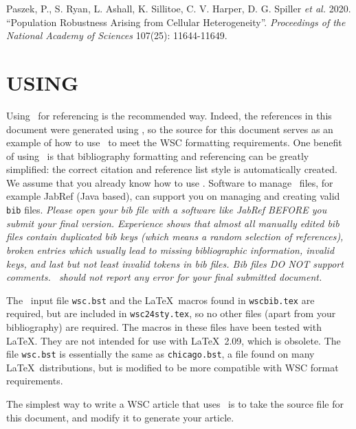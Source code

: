 \documentclass{wscpaperproc}
\theoremstyle{wsc}
\begin{document}
{\footnotesize
\begin{hangref}
\item Paszek, P., S. Ryan, L. Ashall, K. Sillitoe, C. V. Harper, D. G. Spiller \textit{et al.} 2020. ``Population Robustness Arising from Cellular Heterogeneity''. \textit{Proceedings of the National Academy of Sciences} 107(25): 11644-11649.
\end{hangref}
}

\section{USING \texorpdfstring{\BibTeX}{BibTex}}
\label{sec:bibtex}
Using \BibTeX\ for referencing is the recommended way. Indeed, the references in this document were generated using \BibTeX, so the source for this
document serves as an example of how to use \BibTeX\ to meet the WSC formatting requirements.
One benefit of using \BibTeX\ is that bibliography formatting and referencing can be greatly simplified: the correct citation and reference list style is automatically created.
We assume that you already know how to use \BibTeX.
Software to manage \BibTeX\ files, for example JabRef (Java based), can support you on managing and creating valid {\tt bib} files.
{\em Please open your bib file with a software like JabRef BEFORE you submit your final version. Experience shows that almost all manually edited bib files contain duplicated bib keys (which means a random selection of references), broken entries which usually lead to missing bibliographic information, invalid keys, and last but not least invalid tokens in bib files. Bib files DO NOT support comments. \BibTeX\ should not report any error for your final submitted document.}

The \BibTeX\ input file {\tt wsc.bst} and the \LaTeX\ macros found in {\tt wscbib.tex} are required, but are included in {\tt wsc24sty.tex}, so no other files (apart from your bibliography) are required.
The macros in these files have been tested with \LaTeX. They are not intended for use with \LaTeX\ 2.09, which is obsolete.
The file {\tt wsc.bst} is essentially the same as {\tt chicago.bst}, a file found on many \LaTeX\ distributions, but is
modified to be more compatible with WSC format requirements.

The simplest way to write a WSC article that uses \BibTeX\ is to take the source file for this document, and modify it to generate your article. %
\end{document}
